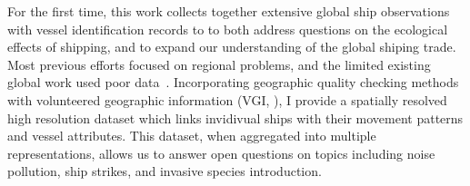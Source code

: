 For the first time, this work collects together extensive global ship observations~\citep{VOSClim,Tetreault2002} with vessel identification records to to both address questions on the ecological effects of shipping, and to expand our understanding of the global shiping trade. Most previous efforts focused on regional problems, and the limited existing global work used poor data~\citep{Corbett2007, Halpern2008}. Incorporating geographic quality checking methods~\citep{goodchildli2012} with volunteered geographic information (VGI, \citealp{goodchild2007citizens}), I provide a spatially resolved high resolution dataset which links invidivual ships with their movement patterns and vessel attributes. This dataset, when aggregated into multiple representations, allows us to answer open questions on topics including noise pollution, ship strikes, and invasive species introduction. 






